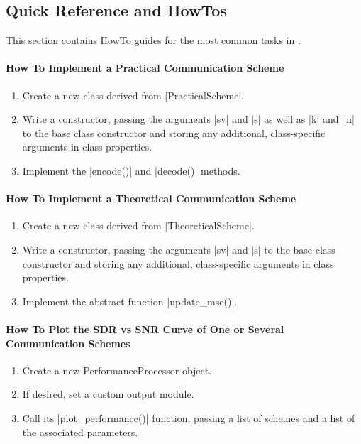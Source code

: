 \subsection{Quick Reference and HowTos}

This section contains HowTo guides for the most common tasks in \jscsim.

\paragraph{How To Implement a Practical Communication Scheme}
\begin{enumerate}
  \item Create a new class derived from |PracticalScheme|. 
  \item Write a constructor, passing the arguments |sv| and |s| as well as |k|
    and~|n| to the base class constructor and storing any additional,
    class-specific arguments in class properties.
  \item Implement the |encode()| and |decode()| methods.
\end{enumerate}


\paragraph{How To Implement a Theoretical Communication Scheme}
\begin{enumerate}
  \item Create a new class derived from |TheoreticalScheme|.
  \item Write a constructor, passing the arguments |sv| and |s| to the base
    class constructor and storing any additional, class-specific arguments in
    class properties.
  \item Implement the abstract function |update_mse()|.
\end{enumerate}


\paragraph{How To Plot the SDR vs SNR Curve of One or Several Communication
Schemes}

\begin{enumerate}
  \item Create a new PerformanceProcessor object.
  \item If desired, set a custom output module.
  \item Call its |plot_performance()| function, passing a list of schemes and
    a list of the associated parameters.
\end{enumerate}


